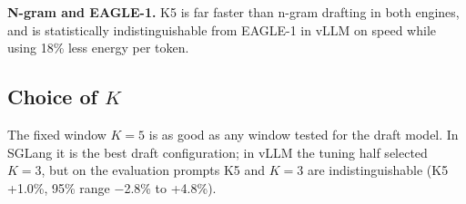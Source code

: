 \documentclass[conference]{IEEEtran}
\begin{document}
\textbf{N-gram and EAGLE-1.} K5 is far faster than n-gram drafting in both
engines, and is statistically indistinguishable from EAGLE-1 in vLLM on
speed while using 18\% less energy per token.

\subsection{Choice of $K$}

The fixed window $K{=}5$ is as good as any window tested for the draft
model. In SGLang it is the best draft configuration; in vLLM the tuning
half selected $K{=}3$, but on the evaluation prompts K5 and $K{=}3$ are
indistinguishable (K5 +1.0\%, 95\% range $-$2.8\% to +4.8\%).

\begin{table}[t]
\centering
\caption{Every configuration, all 27 prompts, two runs each. Accept length
is the mean number of tokens produced per target verification step.
Fidelity: mean share of each output that matches the same engine's first
baseline run before the first differing token / share of outputs that are
identical. Baseline run versus baseline run: 100\% / 100\% in both engines.}
\label{tab:all}
\end{table}
\end{document}

